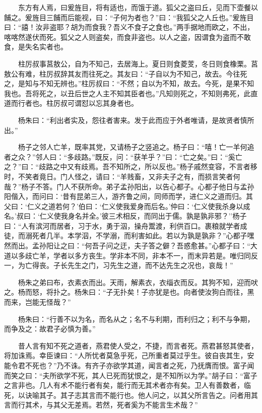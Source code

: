 　　东方有人焉，曰爰旌目，将有适也，而饿于道。狐父之盗曰丘，见而下壶餐以餔之。爰旌目三餔而后能视，曰：``子何为者也？''曰：``我狐父之人丘也。''爰旌目曰：``譆！汝非盗耶？胡为而食我？吾义不食子之食也。''两手据地而欧之，不出，喀喀然遂伏而死。狐父之人则盗矣，而食非盗也。以人之盗，因谓食为盗而不敢食，是失名实者也。

　　柱厉叔事莒敖公，自为不知己，去居海上。夏日则食菱芰，冬日则食橡栗。莒敖公有难，柱厉叔辞其友而往死之。其友曰：``子自以为不知己，故去。今往死之，是知与不知无辨也。''柱厉叔曰：``不然；自以为不知，故去。今死，是果不知我也。吾将死之，以丑后世之人主不知其臣者也。''凡知则死之，不知则弗死，此直道而行者也。柱厉叔可谓怼以忘其身者也。

　　杨朱曰：``利出者实及，怨往者害来。发于此而应于外者唯请，是故贤者慎所出。''

　　杨子之邻人亡羊，既率其党，又请杨子之竖追之。杨子曰：``嘻！亡一羊何追者之众？''邻人曰：``多歧路。''既反，问：``获羊乎？''曰：``亡之矣。''曰：``奚亡之？''曰：``歧路之中又有歧焉。吾不知所之，所以反也。''杨子戚然变容，不言者移时，不笑者竟日。门人怪之，请曰：``羊贱畜，又非夫子之有，而损言笑者何哉？''杨子不答。门人不获所命。弟子孟孙阳出，以告心都子。心都子他日与孟孙阳偕入，而问曰：`昔有昆弟三人，游齐鲁之间，同师而学，进仁义之道而归。其父曰：`仁义之道若何？'伯曰：`仁义使我爱身而后名。'仲曰：`仁义使我杀身以成名。'叔曰：`仁义使我身名并全。'彼三术相反，而同出于儒。孰是孰非邪？''杨子曰：``人有滨河而居者，习于水，勇于泅，操舟鬻渡，利供百口。裹粮就学者成徒，而溺死者几半。本学泅，不学溺，而利害如此。若以为孰是孰非？''心都子嘿然而出。孟孙阳让之曰：``何吾子问之迂，夫子答之僻？吾惑愈甚。''心都子曰：``大道以多歧亡羊，学者以多方丧生。学非本不同，非本不一，而末异若是。唯归同反一，为亡得丧。子长先生之门，习先生之道，而不达先生之况也，哀哉！''

　　杨朱之弟曰布，衣素衣而出。天雨，解素衣，衣缁衣而反。其狗不知，迎而吠之。杨而怒，将扑之。杨朱曰：``子无扑矣！子亦犹是也。向者使汝狗白而往，黑而来，岂能无怪哉？''

　　杨朱曰：``行善不以为名，而名从之；名不与利期，而利归之；利不与争期，而争及之：故君子必慎为善。''

　　昔人言有知不死之道者，燕君使人受之，不捷，而言者死。燕君甚怒其使者，将加诛焉。幸臣谏曰：``人所忧者莫急乎死，己所重者莫过乎生。彼自丧其生，安能令君不死也？''乃不诛。有齐子亦欲学其道，闻言者之死，乃抚膺而恨。富子闻而笑之曰：``夫所欲学不死，其人已死而犹恨之，是不知所以为学。''胡子曰：``富子之言非也。几人有术不能行者有矣，能行而无其术者亦有矣。卫人有善数者，临死，以诀喻其子。其子志其言而不能行也。他人问之，以其父所言告之。问者用其言而行其术，与其父无差焉。若然，死者奚为不能言生术哉？''

